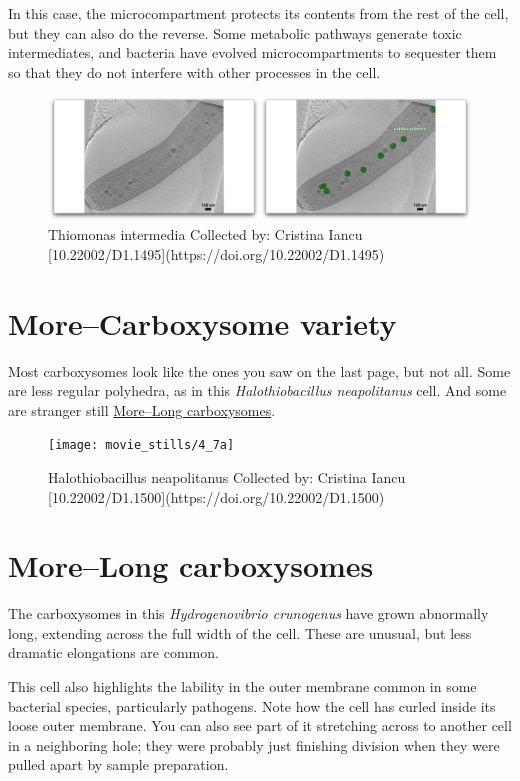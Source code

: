\documentclass[]{tufte-book}
\begin{document}
In this case, the microcompartment protects its contents from the rest
of the cell, but they can also do the reverse. Some metabolic pathways
generate toxic intermediates, and bacteria have evolved
microcompartments to sequester them so that they do not interfere with
other processes in the cell.

\begin{figure}
\includegraphics{movie_stills/4_7} \caption[Thiomonas intermedia Collected by]{Thiomonas intermedia Collected by: Cristina Iancu [10.22002/D1.1495](https://doi.org/10.22002/D1.1495)}\label{fig:unnamed-chunk-69}
\end{figure}

\section{More--Carboxysome variety}\label{morecarboxysome-variety}

Most carboxysomes look like the ones you saw on the last page, but not
all. Some are less regular polyhedra, as in this \emph{Halothiobacillus
neapolitanus} cell. And some are stranger still
\protect\hyperlink{morelong-carboxysomes}{More--Long carboxysomes}.

\begin{figure}
\texttt{[image: movie\_stills/4\_7a]} \caption[Halothiobacillus neapolitanus Collected by]{Halothiobacillus neapolitanus Collected by: Cristina Iancu [10.22002/D1.1500](https://doi.org/10.22002/D1.1500)}\label{fig:unnamed-chunk-70}
\end{figure}

\hypertarget{morelong-carboxysomes}{\section{More--Long
carboxysomes}\label{morelong-carboxysomes}}

The carboxysomes in this \emph{Hydrogenovibrio crunogenus} have grown
abnormally long, extending across the full width of the cell. These are
unusual, but less dramatic elongations are common.

This cell also highlights the lability in the outer membrane common in
some bacterial species, particularly pathogens. Note how the cell has
curled inside its loose outer membrane. You can also see part of it
stretching across to another cell in a neighboring hole; they were
probably just finishing division when they were pulled apart by sample
preparation.
\end{document}
